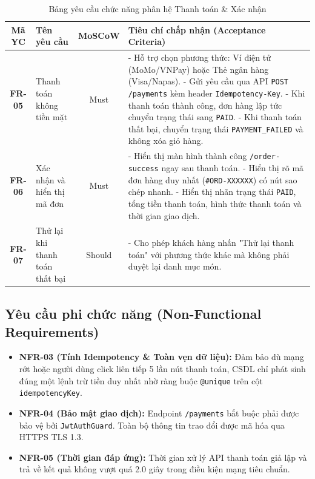\documentclass[a4paper]{article}
\begin{document}
\begin{table}[h!]
\centering
\small
\begin{tabular}{|c|l|c|p{8.5cm}|}
\hline
\textbf{Mã YC} & \textbf{Tên yêu cầu} & \textbf{MoSCoW} & \textbf{Tiêu chí chấp nhận (Acceptance Criteria)} \\ \hline
\textbf{FR-05} & Thanh toán không tiền mặt & Must & 
- Hỗ trợ chọn phương thức: Ví điện tử (MoMo/VNPay) hoặc Thẻ ngân hàng (Visa/Napas). \newline
- Gửi yêu cầu qua API \texttt{POST /payments} kèm header \texttt{Idempotency-Key}. \newline
- Khi thanh toán thành công, đơn hàng lập tức chuyển trạng thái sang \texttt{PAID}. \newline
- Khi thanh toán thất bại, chuyển trạng thái \texttt{PAYMENT\_FAILED} và không xóa giỏ hàng. \\ \hline
\textbf{FR-06} & Xác nhận và hiển thị mã đơn & Must & 
- Hiển thị màn hình thành công \texttt{/order-success} ngay sau thanh toán. \newline
- Hiển thị rõ mã đơn hàng duy nhất (\texttt{\#ORD-XXXXXX}) có nút sao chép nhanh. \newline
- Hiển thị nhãn trạng thái \texttt{PAID}, tổng tiền thanh toán, hình thức thanh toán và thời gian giao dịch. \\ \hline
\textbf{FR-07} & Thử lại khi thanh toán thất bại & Should & 
- Cho phép khách hàng nhấn "Thử lại thanh toán" với phương thức khác mà không phải duyệt lại danh mục món. \\ \hline
\end{tabular}
\caption{Bảng yêu cầu chức năng phân hệ Thanh toán \& Xác nhận}
\end{table}

\subsection{Yêu cầu phi chức năng (Non-Functional Requirements)}
\begin{itemize}
    \item \textbf{NFR-03 (Tính Idempotency \& Toàn vẹn dữ liệu):} Đảm bảo dù mạng rớt hoặc người dùng click liên tiếp 5 lần nút thanh toán, CSDL chỉ phát sinh đúng một lệnh trừ tiền duy nhất nhờ ràng buộc \texttt{@unique} trên cột \texttt{idempotencyKey}.
    \item \textbf{NFR-04 (Bảo mật giao dịch):} Endpoint \texttt{/payments} bắt buộc phải được bảo vệ bởi \texttt{JwtAuthGuard}. Toàn bộ thông tin trao đổi được mã hóa qua HTTPS TLS 1.3.
    \item \textbf{NFR-05 (Thời gian đáp ứng):} Thời gian xử lý API thanh toán giả lập và trả về kết quả không vượt quá 2.0 giây trong điều kiện mạng tiêu chuẩn.
\end{itemize}
\end{document}
